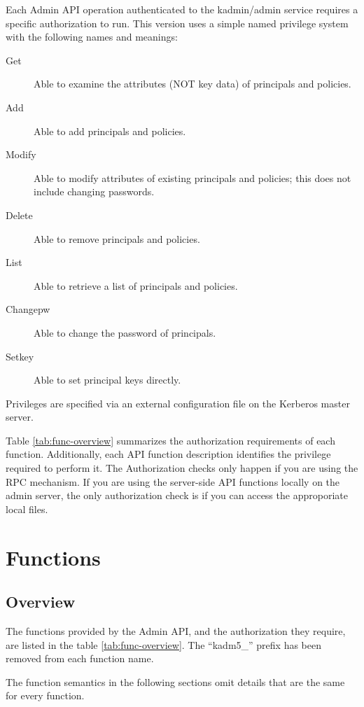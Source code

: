 Each Admin API operation authenticated to the kadmin/admin service
requires a specific authorization to run.  This version uses a simple
named privilege system with the following names and meanings:

\begin{description}
\item[Get] Able to examine the attributes (NOT key data) of principals
and policies.
\item[Add] Able to add principals and policies.
\item[Modify] Able to modify attributes of existing principals and
policies; this does not include changing passwords.
\item[Delete] Able to remove principals and policies.
\item[List] Able to retrieve a list of principals and policies.
\item[Changepw] Able to change the password of principals.
\item[Setkey] Able to set principal keys directly.
\end{description}

Privileges are specified via an external configuration file on the
Kerberos master server.

Table \ref{tab:func-overview} summarizes the authorization
requirements of each function.  Additionally, each API function
description identifies the privilege required to perform it.  The
Authorization checks only happen if you are using the RPC mechanism.
If you are using the server-side API functions locally on the admin
server, the only authorization check is if you can access the
approporiate local files.

\section{Functions}

\subsection{Overview}

The functions provided by the Admin API, and the authorization they
require, are listed in the table \ref{tab:func-overview}.  The
``kadm5_'' prefix has been removed from each function name.

The function semantics in the following sections omit details that are
the same for every function.

